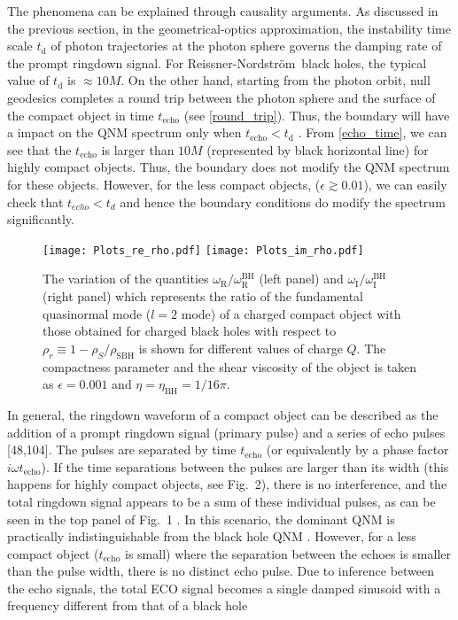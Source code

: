 \documentclass[aps,prd,twocolumn,floatfix,noshowpacs,tightenlines,noshowkeys,superscriptaddress,amsmath,amssymb,
nofootinbib]{revtex4-1}
\renewcommand\[{\begin{equation}}
\renewcommand\]{\end{equation}}
\def\RN{Reissner-Nordstr\"{o}m}
\begin{document}
 The phenomena can be explained through causality arguments. As discussed in the previous section, in the geometrical-optics approximation, the instability time scale $t_{\textrm{d}}$ of photon trajectories at the photon sphere governs the damping rate of the prompt ringdown signal. For \RN\ black holes, the typical value of $t_{\textrm{d}}$ is $\approx 10M$. On the other hand,  starting from the photon orbit, null geodesics completes a round trip between the photon sphere and the surface of the compact object in time $t_{\textrm{echo}}$ (see \autoref{round_trip}). Thus, the boundary will have a impact on the QNM spectrum only when $t_{\textrm{echo}}<t_{\textrm{d}}$ \cite{Maggio:2020jml}. From \autoref{echo_time}, we can see that the $t_{\textrm{echo}}$ is larger than $ 10M $ (represented by black horizontal line) for highly compact objects. Thus, the boundary does not modify the QNM spectrum for these objects.
 However, for the less compact objects, ($ \epsilon \gtrsim 0.01 $), we can easily check that $ t_{echo}<t_d $ and hence the
 boundary conditions do modify the spectrum significantly.
 \begin{figure*}[t]
 	\centering
 	\texttt{[image: Plots\_re\_rho.pdf]}
 	\endminipage\hfill
 	\texttt{[image: Plots\_im\_rho.pdf]}
 	\endminipage
 		\caption{The variation of the quantities $\omega_{\textrm{R}}/\omega_{\textrm{R}}^{\textrm{BH}}$ (left panel) and $\omega_{\textrm{I}}/\omega_{\textrm{I}}^{\textrm{BH}}$ (right panel) which represents the ratio of the fundamental quasinormal mode ($l=2$ mode) of a charged compact object with those obtained for charged black holes with respect to $\rho_r\equiv1-\rho_{S}/\rho_{\textrm{SBH}}$ is shown for different values of charge $Q$. The compactness parameter and the shear viscosity of the object is taken as $\epsilon=0.001$ and $\eta=\eta_{\textrm{BH}}=1/16\pi$.  }\label{rho}
 \end{figure*}
 \par
In general, the ringdown waveform of a compact object can be described as the addition of a prompt ringdown signal (primary pulse) and a series of echo pulses [48,104]. The pulses are separated by time $t_{\textrm{echo}}$ (or equivalently by a phase factor $i\omega t_{\textrm{echo}} $). If the time separations between the pulses are larger than its width (this happens for highly compact objects, see Fig.~2), there is no interference, and the total ringdown signal appears to be a sum of these individual pulses, as can be seen in the top panel of Fig.~1 \cite{Mark:2017dnq}. In this scenario, the dominant QNM is practically indistinguishable from the black hole QNM \cite{Mark:2017dnq, Bueno:2017hyj}. However, for a less compact object ($t_{\textrm{echo}}$ is small) where the separation between the echoes is smaller than the pulse width, there is no distinct echo pulse. Due to inference between the echo signals, the total ECO signal becomes a single damped sinusoid with a frequency different from that of a black hole
\end{document}
